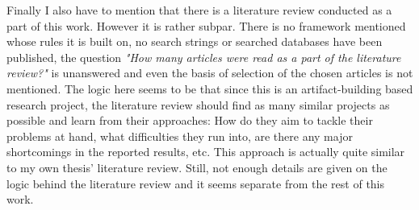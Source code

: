 \documentclass{article}
\begin{document}
	\par Finally I also have to mention that there is a literature review 
conducted as a part of this work. However it is rather subpar. There is no 
framework mentioned whose rules it is built on, no search strings or searched 
databases have been published, the question 
\textit{"How many articles were read as a part of the literature review?"} is 
unanswered and even the basis of selection of the chosen articles is not 
mentioned. The logic here seems to be that since this is an artifact-building 
based research project, the literature review should find as many similar 
projects as possible and learn from their approaches: How do they aim to 
tackle their problems at hand, what difficulties they run into, are there any 
major shortcomings in the reported results, etc. This approach is actually 
quite similar to my own thesis' literature review. Still, not enough details 
are given on the logic behind the literature review and it seems separate from 
the rest of this work.

\end{document}
